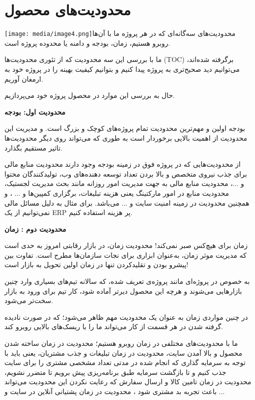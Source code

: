 \documentclass[]{article}
\begin{document}
\section{محدودیت‌های
محصول}\label{ux645ux62dux62fux648ux62fux6ccux62aux647ux627ux6cc-ux645ux62dux635ux648ux644}

\texttt{[image: media/image4.png]}محدودیت‌های
سه‌گانه‌ای که در هر پروژه ما با آن‌ها روبرو هستیم، زمان، بودجه و دامنه
یا محدوده پروژه است.

ما با بررسی این سه محدودیت که از تئوری محدودیت‌ها (TOC) برگرفته شده‌اند،
می‌توانیم دید صحیح‌تری به پروژه پیدا کنیم و بتوانیم کیفیت بهینه را در
پروژه خود به ارمغان آوریم.

حال به بررسی این موارد در محصول پروژه خود می‌پردازیم.

\textbf{محدودیت اول: بودجه}

بودجه اولین و مهم‌ترین محدودیت تمام پروژه‌های کوچک و بزرگ است. و مدیریت
این محدودیت از اهمیت بالایی برخوردار است به طوری که می‌تواند روی دیگر
محدودیت‌ها تاثیر مستقیم بگذارد.

از محدودیت‌هایی که در پروژه فوق در زمینه بودجه وجود دارند محدودیت منابع
مالی برای جذب نیروی متخصص و بالا بردن تعداد توسعه دهنده‌های وب،
تولیدکنندگان محتوا و ...، محدودیت منابع مالی به جهت مدیریت امور روزانه
مانند بحث مدیریت لجستیک، محدودیت منابع در امور مارکتینگ یعنی هزینه
تبلیغات، برگزاری کمپین‌ها و ... ، و همچنین محدودیت در زمینه امنیت سایت و
... می‌باشد. برای مثال به دلیل مسائل مالی نمی‌توانیم از یک ERP پر هزینه
استفاده کنیم.

\textbf{محدودیت دوم : زمان}

زمان برای هیچ‌کس صبر نمی‌کند! محدودیت زمان، در بازار رقابتی امروز به‌
حدی است که مدیریت‌ موثر زمان، به‌عنوان ابزاری برای نجات سازمان‌ها مطرح
‌است. تفاوت بین پیشرو بودن و تقلیدکردن تنها در زمان اولین تحویل به بازار
است!

به ‌خصوص در پروژه‌ای مانند پروژه‌ی تعریف شده، که سالانه تیم‌های بسیاری
وارد چنین بازارهایی می‌شوند و هرچه این محصول دیرتر آماده شود، کار تیم
برای ورود به بازار سخت‌تر می‌شود.

در چنین مواردی زمان به عنوان یک محدودیت مهم ظاهر می‌شود؛ که در صورت
نادیده گرفته شدن در هر قسمت از کار می‌تواند ما را با ریسک‌های بالایی
روبرو کند.

ما با محدودیت‌های مختلفی در زمان روبرو هستیم؛ محدودیت در زمان ساخته شدن
محصول و بالا آمدن سایت، محدودیت در زمان تبلیغات و جذب مشتریان، یعنی باید
با توجه به سرمایه گذاری که انجام شده در مدتی تعداد مشخصی مشتری را برای
سایت جذب کنیم و تا بازگشت سرمایه طبق برنامه‌ریزی پیش برویم تا متضرر
نشویم، محدودیت در زمان تامین کالا و ارسال سفارش که رعایت نکردن این
محدودیت می‌تواند باعث تجربه بد مشتری شود ، محدودیت در زمان پشتیانی
آنلاین در سایت و ...
\end{document}

